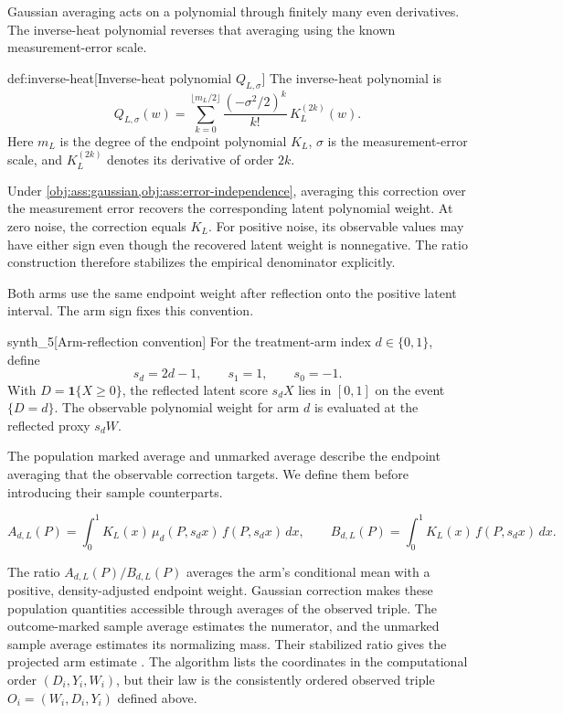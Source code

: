 \documentclass[11pt]{article}
\begin{document}
Gaussian averaging acts on a polynomial through finitely many even derivatives. The inverse-heat polynomial  reverses that averaging using the known measurement-error scale.

\begin{definitionv}{def:inverse-heat}[Inverse-heat polynomial $Q_{L,\sigma}$]
The inverse-heat polynomial is
\[
Q_{L,\sigma}(w)
=
\sum_{k=0}^{\lfloor m_L/2\rfloor}
\frac{(-\sigma^2/2)^k}{k!}\,
K_L^{(2k)}(w).
\]
Here \(m_L\) is the degree of the endpoint polynomial \(K_L\), \(\sigma\) is the measurement-error scale, and \(K_L^{(2k)}\) denotes its derivative of order \(2k\).
\end{definitionv}

Under \cref{obj:ass:gaussian,obj:ass:error-independence}, averaging this correction over the measurement error recovers the corresponding latent polynomial weight. At zero noise, the correction equals \(K_L\). For positive noise, its observable values may have either sign even though the recovered latent weight is nonnegative. The ratio construction therefore stabilizes the empirical denominator explicitly.

Both arms use the same endpoint weight after reflection onto the positive latent interval. The arm sign  fixes this convention.

\begin{definitionv}{synth_5}[Arm-reflection convention]
For the treatment-arm index \(d\in\{0,1\}\), define
\[
s_d=2d-1,
\qquad s_1=1,\qquad s_0=-1.
\]
With \(D=\mathbf1\{X\ge0\}\), the reflected latent score \(s_dX\) lies in \([0,1]\) on the event \(\{D=d\}\). The observable polynomial weight for arm \(d\) is evaluated at the reflected proxy \(s_dW\).
\end{definitionv}

The population marked average  and unmarked average  describe the endpoint averaging that the observable correction targets. We define them before introducing their sample counterparts.

\[
A_{d,L}(P)
=\int_0^1 K_L(x)\,\mu_d(P,s_dx)\,f(P,s_dx)\,dx,
\qquad
B_{d,L}(P)
=\int_0^1 K_L(x)\,f(P,s_dx)\,dx.
\]

The ratio \(A_{d,L}(P)/B_{d,L}(P)\) averages the arm's conditional mean with a positive, density-adjusted endpoint weight. Gaussian correction makes these population quantities accessible through averages of the observed triple. The outcome-marked sample average  estimates the numerator, and the unmarked sample average  estimates its normalizing mass. Their stabilized ratio gives the projected arm estimate . The algorithm lists the coordinates in the computational order \((D_i,Y_i,W_i)\), but their law is the consistently ordered observed triple \(O_i=(W_i,D_i,Y_i)\) defined above.
\end{document}
